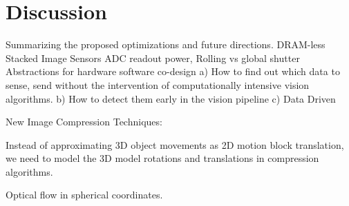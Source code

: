 \chapter{Discussion}
Summarizing the proposed optimizations and future directions.
DRAM-less
Stacked Image Sensors
ADC readout power, Rolling vs global shutter
Abstractions for hardware software co-design
a) How to find out which data to sense, send without the intervention of computationally intensive vision algorithms.
b) How to detect them early in the vision pipeline
c) Data Driven 


    New Image Compression Techniques:​

Instead of approximating 3D object movements as 2D motion block translation, we need to model the 3D model rotations and translations in compression algorithms.

Optical flow in spherical coordinates.
	

